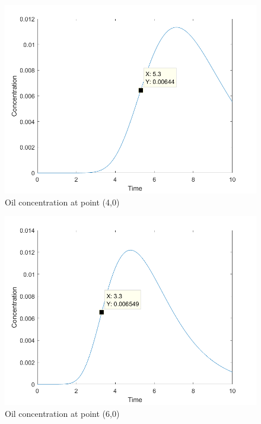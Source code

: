 \documentclass[12pt]{article}
\begin{document}
\begin{figure}[bht]
\begin{center}
\includegraphics[width=1\textwidth]{concentration4}
\end{center}
\caption{Oil concentration at point (4,0)} \label{fig::MyFigure}
\end{figure}

\begin{figure}[bht]
\begin{center}
\includegraphics[width=1\textwidth]{concentration6}
\end{center}
\caption{Oil concentration at point (6,0)} \label{fig::MyFigure}
\end{figure}
\end{document}

